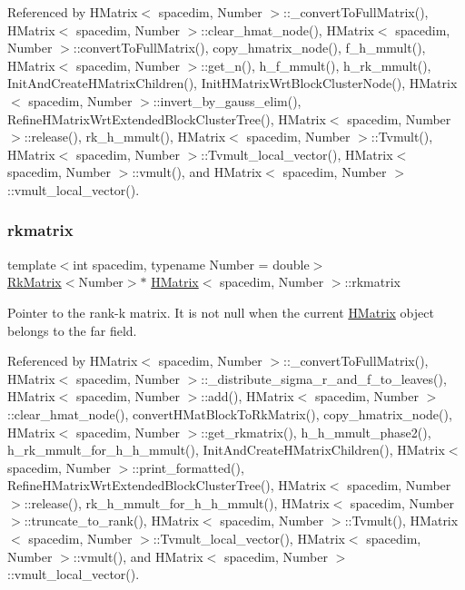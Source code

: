 Referenced by H\+Matrix$<$ spacedim, Number $>$\+::\+\_\+convert\+To\+Full\+Matrix(), H\+Matrix$<$ spacedim, Number $>$\+::clear\+\_\+hmat\+\_\+node(), H\+Matrix$<$ spacedim, Number $>$\+::convert\+To\+Full\+Matrix(), copy\+\_\+hmatrix\+\_\+node(), f\+\_\+h\+\_\+mmult(), H\+Matrix$<$ spacedim, Number $>$\+::get\+\_\+n(), h\+\_\+f\+\_\+mmult(), h\+\_\+rk\+\_\+mmult(), Init\+And\+Create\+H\+Matrix\+Children(), Init\+H\+Matrix\+Wrt\+Block\+Cluster\+Node(), H\+Matrix$<$ spacedim, Number $>$\+::invert\+\_\+by\+\_\+gauss\+\_\+elim(), Refine\+H\+Matrix\+Wrt\+Extended\+Block\+Cluster\+Tree(), H\+Matrix$<$ spacedim, Number $>$\+::release(), rk\+\_\+h\+\_\+mmult(), H\+Matrix$<$ spacedim, Number $>$\+::\+Tvmult(), H\+Matrix$<$ spacedim, Number $>$\+::\+Tvmult\+\_\+local\+\_\+vector(), H\+Matrix$<$ spacedim, Number $>$\+::vmult(), and H\+Matrix$<$ spacedim, Number $>$\+::vmult\+\_\+local\+\_\+vector().

\mbox{\label{classHMatrix_aa97a8f5e42aba0f1d5faf41f35a27819}} 
\subsubsection{\texorpdfstring{rkmatrix}{rkmatrix}}
{\footnotesize\ttfamily template$<$int spacedim, typename Number = double$>$ \\
\hyperlink{classRkMatrix}{Rk\+Matrix}$<$Number$>$$\ast$ \hyperlink{classHMatrix}{H\+Matrix}$<$ spacedim, Number $>$\+::rkmatrix\hspace{0.3cm}{\ttfamily [private]}}

Pointer to the rank-\/k matrix. It is not null when the current \hyperlink{classHMatrix}{H\+Matrix} object belongs to the far field. 

Referenced by H\+Matrix$<$ spacedim, Number $>$\+::\+\_\+convert\+To\+Full\+Matrix(), H\+Matrix$<$ spacedim, Number $>$\+::\+\_\+distribute\+\_\+sigma\+\_\+r\+\_\+and\+\_\+f\+\_\+to\+\_\+leaves(), H\+Matrix$<$ spacedim, Number $>$\+::add(), H\+Matrix$<$ spacedim, Number $>$\+::clear\+\_\+hmat\+\_\+node(), convert\+H\+Mat\+Block\+To\+Rk\+Matrix(), copy\+\_\+hmatrix\+\_\+node(), H\+Matrix$<$ spacedim, Number $>$\+::get\+\_\+rkmatrix(), h\+\_\+h\+\_\+mmult\+\_\+phase2(), h\+\_\+rk\+\_\+mmult\+\_\+for\+\_\+h\+\_\+h\+\_\+mmult(), Init\+And\+Create\+H\+Matrix\+Children(), H\+Matrix$<$ spacedim, Number $>$\+::print\+\_\+formatted(), Refine\+H\+Matrix\+Wrt\+Extended\+Block\+Cluster\+Tree(), H\+Matrix$<$ spacedim, Number $>$\+::release(), rk\+\_\+h\+\_\+mmult\+\_\+for\+\_\+h\+\_\+h\+\_\+mmult(), H\+Matrix$<$ spacedim, Number $>$\+::truncate\+\_\+to\+\_\+rank(), H\+Matrix$<$ spacedim, Number $>$\+::\+Tvmult(), H\+Matrix$<$ spacedim, Number $>$\+::\+Tvmult\+\_\+local\+\_\+vector(), H\+Matrix$<$ spacedim, Number $>$\+::vmult(), and H\+Matrix$<$ spacedim, Number $>$\+::vmult\+\_\+local\+\_\+vector().

